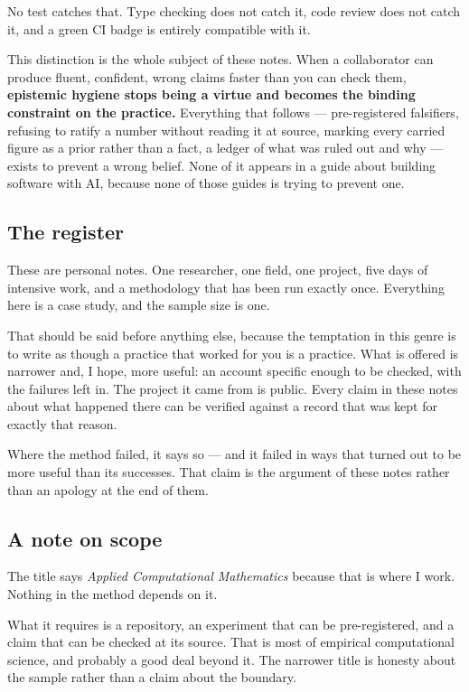 No test catches that. Type checking does not catch it, code review does not catch it, and a green CI badge is entirely compatible with it.

This distinction is the whole subject of these notes. When a collaborator can produce fluent, confident, wrong claims faster than you can check them, \textbf{epistemic hygiene stops being a virtue and becomes the binding constraint on the practice.} Everything that follows --- pre-registered falsifiers, refusing to ratify a number without reading it at source, marking every carried figure as a prior rather than a fact, a ledger of what was ruled out and why --- exists to prevent a wrong belief. None of it appears in a guide about building software with AI, because none of those guides is trying to prevent one.

\subsection{The register}

These are personal notes. One researcher, one field, one project, five days of intensive work, and a methodology that has been run exactly once. Everything here is a case study, and the sample size is one.

That should be said before anything else, because the temptation in this genre is to write as though a practice that worked for you is a practice. What is offered is narrower and, I hope, more useful: an account specific enough to be checked, with the failures left in. The project it came from is public. Every claim in these notes about what happened there can be verified against a record that was kept for exactly that reason.

Where the method failed, it says so --- and it failed in ways that turned out to be more useful than its successes. That claim is the argument of these notes rather than an apology at the end of them.

\subsection{A note on scope}

The title says \textit{Applied Computational Mathematics} because that is where I work. Nothing in the method depends on it.

What it requires is a repository, an experiment that can be pre-registered, and a claim that can be checked at its source. That is most of empirical computational science, and probably a good deal beyond it. The narrower title is honesty about the sample rather than a claim about the boundary.
